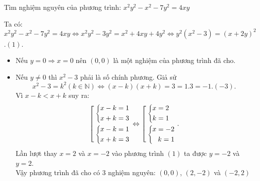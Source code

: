 \begin{bt}%
	Tìm nghiệm nguyên của phương trình: $x^2y^2-x^2-7y^2=4xy$
	\loigiai
	{Ta có: 
		$x^2y^2-x^2-7y^2=4xy\Leftrightarrow x^2y^2-3y^2=x^2+4xy+4y^2\Leftrightarrow y^2(x^2-3)=(x+2y)^2$.\hfill$(1)$.
		\begin{itemize}
			\item Nếu $y=0\Rightarrow x=0$ nên $(0,0)$ là một nghiệm của phương trình đã cho.
			\item Nếu $y\neq 0$ thì $x^2-3$ phải là số chính phương. Giả sử 
			$$x^2-3=k^2(k\in \mathbb{N})\Leftrightarrow (x-k)(x+k)=3=1.3=-1.(-3).$$
			Vì $x-k<x+k$ suy ra: \\
			$$\left[\begin{aligned}&\left\{\begin{aligned}x-k=1\\x+k=3\end{aligned}\right.\\ &\left\{\begin{aligned}x-k=1\\x+k=3\end{aligned}\right.\end{aligned}\right.\Leftrightarrow \left[\begin{aligned}&\left\{\begin{aligned}x=2\\k=1\end{aligned}\right.\\ &\left\{\begin{aligned}x=-2\\k=1\end{aligned}\right.\end{aligned}\right..$$
			Lần lượt thay $x=2$ và $x=-2$ vào phương trình $(1)$ ta được $y=-2$ và $y=2$.\\
			Vậy phương trình đã cho có 3 nghiệm nguyên: $(0,0)$, $(2,-2)$ và $(-2,2)$
		\end{itemize}
	}
\end{bt}

